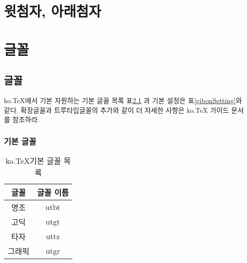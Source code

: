 \newpage  
\chapter{윗첨자, 아래첨자}

																																						
																																								
																																										
																																												
							








\newpage  
\chapter{글꼴}

	\newpage  \null
	\section{글꼴}

			ko.TeX에서 기본 자원하는 기본 글꼴 목록 표\ref{gibonFont} 과 
			기본 설정은 표\ref{gibonSetting}와 같다. 
			확장글꼴과 트루타입글꼴의 추가와 같이 더 자세한 사항은 ko.TeX 가이드 문서를 참조하라.
		
	\subsection{기본 글꼴}
				\vspace{-1cm}
				\begin{table}[hbp]
				\caption{ko.TeX기본 글꼴 목록}
				\centering
				\begin{tabular}{c c}
				\toprule
				글꼴 & 글꼴 이름\\
				\toprule
				명조	& utbt  \\
				고딕	& utgt \\
				타자	& uttz \\
				그래픽	& utgr \\
				\bottomrule
				\end{tabular}%
				\label{gibonFont}%
				\end{table}%
		

